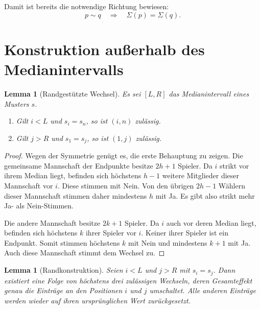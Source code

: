 \documentclass[12pt]{article}
\newtheorem{lemma}[satz]{Lemma}
\begin{document}
Damit ist bereits die notwendige Richtung bewiesen:
\begin{equation}
p\sim q\quad\Longrightarrow\quad\Sigma(p)=\Sigma(q).
\label{eq:notwendigkeit}
\end{equation}

\section{Konstruktion außerhalb des Medianintervalls}

\begin{lemma}[Randgestützte Wechsel]
\label{lem:randwechsel}
Es sei $[L,R]$ das Medianintervall eines Musters $s$.
\begin{enumerate}
\item Gilt $i<L$ und $s_i=s_n$, so ist $(i,n)$ zulässig.
\item Gilt $j>R$ und $s_1=s_j$, so ist $(1,j)$ zulässig.
\end{enumerate}
\end{lemma}

\begin{proof}
Wegen der Symmetrie genügt es, die erste Behauptung zu zeigen. Die gemeinsame
Mannschaft der Endpunkte besitze $2h+1$ Spieler. Da $i$ strikt vor ihrem
Median liegt, befinden sich höchstens $h-1$ weitere Mitglieder dieser
Mannschaft vor $i$. Diese stimmen mit Nein. Von den übrigen $2h-1$ Wählern
dieser Mannschaft stimmen daher mindestens $h$ mit Ja. Es gibt also strikt
mehr Ja- als Nein-Stimmen.

Die andere Mannschaft besitze $2k+1$ Spieler. Da $i$ auch vor deren Median
liegt, befinden sich höchstens $k$ ihrer Spieler vor $i$. Keiner ihrer Spieler
ist ein Endpunkt. Somit stimmen höchstens $k$ mit Nein und mindestens $k+1$
mit Ja. Auch diese Mannschaft stimmt dem Wechsel zu.
\end{proof}

\begin{lemma}[Randkonstruktion]
\label{lem:randkonstruktion}
Seien $i<L$ und $j>R$ mit $s_i=s_j$. Dann existiert eine Folge von höchstens
drei zulässigen Wechseln, deren Gesamteffekt genau die Einträge an den
Positionen $i$ und $j$ umschaltet. Alle anderen Einträge werden wieder auf
ihren ursprünglichen Wert zurückgesetzt.
\end{lemma}
\end{document}
